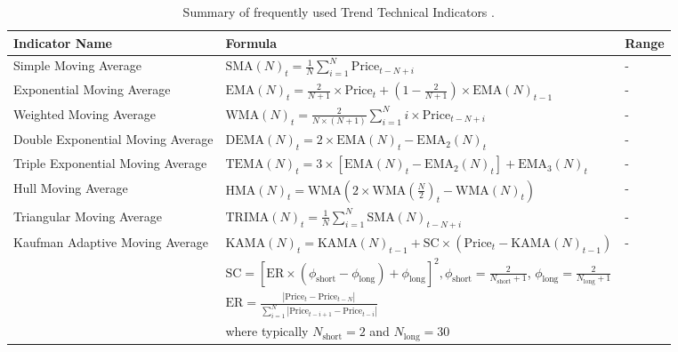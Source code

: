 \begin{table}[htb!]
\centering
\footnotesize
\begin{tabularx}{\textwidth}{@{}lXl@{}}
\toprule
\textbf{Indicator Name} & \textbf{Formula} & \textbf{Range} \\ 
\midrule
Simple Moving Average & $\text{SMA}(N)_t = \frac{1}{N} \sum_{i=1}^{N} \text{Price}_{t-N+i}$ & - \\
\addlinespace
Exponential Moving Average & $\text{EMA}(N)_t = \frac{2}{N+1} \times \text{Price}_t + (1 - \frac{2}{N+1}) \times \text{EMA}(N)_{t-1}$ & - \\
\addlinespace
Weighted Moving Average & $\text{WMA}(N)_t = \frac{2}{N \times (N + 1)} \sum_{i=1}^{N} i \times \text{Price}_{t-N+i}$ & - \\
\addlinespace
Double Exponential Moving Average & $\text{DEMA}(N)_t = 2 \times \text{EMA}(N)_t - \text{EMA}_2(N)_t$ & - \\
\addlinespace
Triple Exponential Moving Average & $\text{TEMA}(N)_t = 3 \times [\text{EMA}(N)_t - \text{EMA}_2(N)_t] + \text{EMA}_3(N)_t$ & - \\
\addlinespace
Hull Moving Average & $\text{HMA}(N)_t = \text{WMA}\left(2 \times \text{WMA}\left(\frac{N}{2}\right)_t - \text{WMA}(N)_t\right)$ & - \\
\addlinespace
Triangular Moving Average & $\text{TRIMA}(N)_t = \frac{1}{N} \sum_{i=1}^{N} \text{SMA}(N)_{t-N+i}$ & - \\
\addlinespace
Kaufman Adaptive Moving Average & $\text{KAMA}(N)_t = \text{KAMA}(N)_{t-1} + \text{SC} \times (\text{Price}_t - \text{KAMA}(N)_{t-1})$ & - \\
\addlinespace
& $\text{SC} = [ \text{ER} \times (\phi_{\text{short}} - \phi_{\text{long}}) + \phi_{\text{long}} ]^2, \phi_{\text{short}} = \frac{2}{N_{\text{short}} + 1}$, $\phi_{\text{long}} = \frac{2}{N_{\text{long}} + 1}$ & \\
\addlinespace
& $\text{ER} = \frac{| \text{Price}_t - \text{Price}_{t-N} |}{\sum_{i=1}^{N} | \text{Price}_{t-i+1} - \text{Price}_{t-i} |}$ & \\
\addlinespace
& where typically $N_{\text{short}} = 2$ and $N_{\text{long}} = 30$ & \\
\bottomrule
\end{tabularx}
\caption{Summary of frequently used Trend Technical Indicators \cite{jansen_machine_2020}.}
\label{Tables:TrendIndicators}
\end{table}
